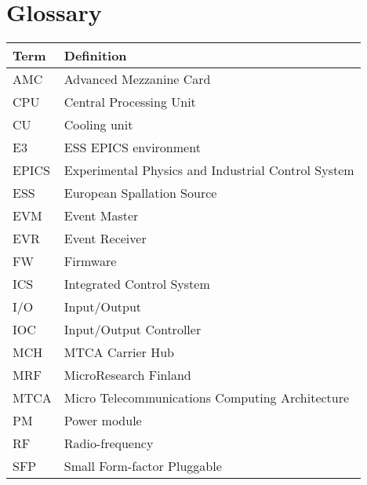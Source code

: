 \documentclass[11pt
  , a4paper
  , article
  , oneside
  , showtrims
]{memoir}
\begin{document}
\chapter*{Glossary}\label{sec:glossary}
\begin{table}[!htb]
  \begin{tabular}{ll}
    \toprule
    \textbf{Term} & Definition                                          \\\midrule
    AMC           & Advanced Mezzanine Card                             \\
    CPU           & Central Processing Unit                             \\
    CU            & Cooling unit                                        \\
    E3            & ESS EPICS environment                               \\
    EPICS         & Experimental Physics and Industrial Control System  \\
    ESS           & European Spallation Source                          \\
    EVM           & Event Master                                        \\
    EVR           & Event Receiver                                      \\
    FW            & Firmware                                            \\
    ICS           & Integrated Control System                           \\
    I/O           & Input/Output                                        \\
    IOC           & Input/Output Controller                             \\
    MCH           & MTCA Carrier Hub                                    \\
    MRF           & MicroResearch Finland                               \\
    MTCA          & Micro Telecommunications Computing Architecture     \\
    PM            & Power module                                        \\
    RF            & Radio-frequency                                     \\
    SFP           & Small Form-factor Pluggable                         \\
    \bottomrule
  \end{tabular}
  \label{table:glossary}
\end{table}
\end{document}
